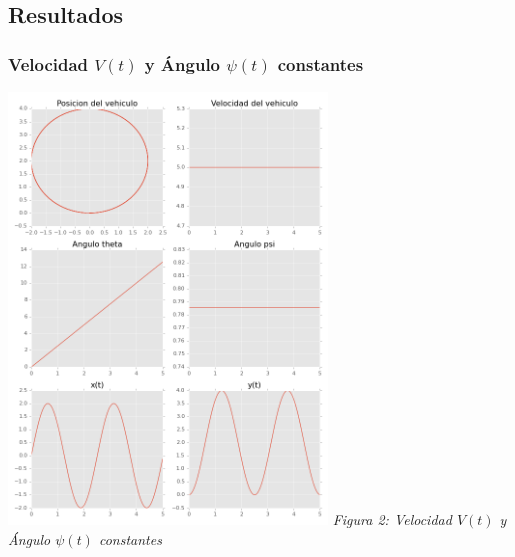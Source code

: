 \documentclass[twoside]{article}
\begin{document}
\begin{multicols}{2}
\subsection{Resultados}
\subsubsection{Velocidad $V(t)$ y Ángulo $\psi(t)$ constantes}
\begin{center}
 \includegraphics[width=240pt,height=325pt]{./v_const_psi_const.png}
  \textit{Figura 2: Velocidad $V(t)$ y Ángulo $\psi(t)$ constantes}
\end{center}
\vspace*{7\baselineskip}

\end{multicols}
\end{document}
